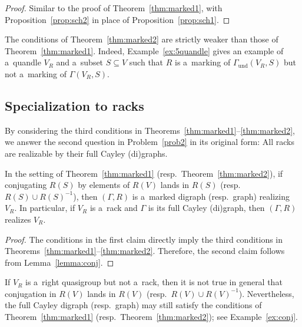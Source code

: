 \documentclass{jonasart}
\newcommand{\inv}{^{-1}}
\newcommand{\und}{\mathrm{und}}
\begin{document}
	\begin{proof}
		Similar to the proof of Theorem~\ref{thm:marked1}, with Proposition~\ref{prop:sch2} in place of Proposition~\ref{prop:sch1}.
	\end{proof}

	\begin{remark}
		The conditions of Theorem~\ref{thm:marked2} are strictly weaker than those of Theorem~\ref{thm:marked1}. Indeed, Example~\ref{ex:5quandle} gives an example of a~quandle $V_R$ and a~subset $S\subseteq V$ such that $R$ is a~marking of $\Gamma_{\und}(V_R,S)$ but not a~marking of $\Gamma(V_R,S)$.
	\end{remark}
    
	\subsection{Specialization to racks}
	
    By considering the third conditions in Theorems~\ref{thm:marked1}--\ref{thm:marked2}, we answer the second question in Problem~\ref{prob2} in its original form: All racks are realizable by their full Cayley (di)graphs.
	
    \begin{corollary}\label{cor:conj}
		In the setting of Theorem~\ref{thm:marked1} \textup{(}resp.\ Theorem~\ref{thm:marked2}\textup{)}, if conjugating $R(S)$ by elements of $R(V)$ lands in $R(S)$ \textup{(}resp.\ $R(S)\cup R(S)\inv$\textup{)}, then $(\Gamma,R)$ is a~marked digraph \textup{(}resp.\ graph\textup{)} realizing $V_R$. In particular, if $V_R$ is a~rack and $\Gamma$ is its full Cayley \textup{(}di\textup{)}graph, then $(\Gamma,R)$ realizes $V_R$.
	\end{corollary}

	\begin{proof}
		The conditions in the first claim directly imply the third conditions in Theorems~\ref{thm:marked1}--\ref{thm:marked2}. Therefore, the second claim follows from Lemma~\ref{lemma:conj}.
	\end{proof}

	\begin{remark}
		If $V_R$ is a~right quasigroup but not a~rack, then it is not true in general that conjugation in $R(V)$ lands in $R(V)$ (resp.\ $R(V)\cup R(V)\inv$). Nevertheless, the full Cayley digraph (resp.\ graph) may still satisfy the conditions of Theorem~\ref{thm:marked1} (resp.\ Theorem~\ref{thm:marked2}); see Example~\ref{ex:conj}.
	\end{remark}
\end{document}
